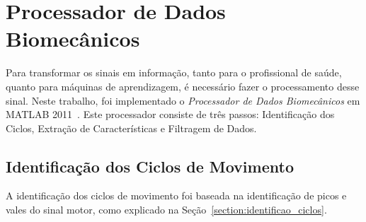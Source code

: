 % 
% 		
% 		
% 
% 		

\section{Processador de Dados Biomecânicos}\label{sec:processador_bio}
Para transformar os sinais em informação, tanto para o profissional de saúde, quanto para máquinas de aprendizagem, é necessário fazer o processamento desse sinal. Neste trabalho, foi implementado o \textit{Processador de Dados Biomecânicos} em MATLAB 2011~\cite{matlab2011}. Este processador consiste de três passos: Identificação dos Ciclos, Extração de Características e Filtragem de Dados.

\subsection{Identificação dos Ciclos de Movimento} 
A identificação dos ciclos de movimento foi baseada na identificação de picos e vales do sinal motor, como explicado na Seção~\ref{section:identificao_ciclos}. 

